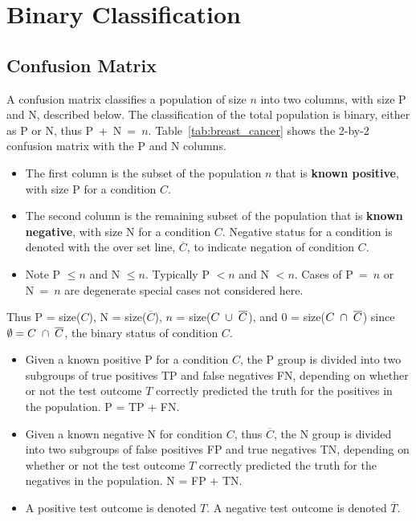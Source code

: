 \chapter{Binary Classification}

\section{Confusion Matrix}

A confusion matrix classifies a population of size $n$ into two 
columns, with size P and N, described below.  The classification
of the total population is binary, either as P 
or N, thus P~+~N~=~$n$.
Table~\ref{tab:breast_cancer} shows
the 2-by-2 confusion matrix with the P and N columns. 
\begin{itemize}
\item The first column is the subset of the population $n$
that is {\bf known positive}, with size P 
for a condition $C$.  
\item The second column is the remaining subset of 
the population that is {\bf known negative}, with
size N for a condition $C$.  Negative status for
a condition is denoted
with the over set line, $\overline{C}$, 
to indicate negation of
condition $C$.  
\item Note P $\leq n$ and N $\leq n$.  Typically P $< n$
and N $< n$.  Cases of P~=~$n$ or N~=~$n$ are degenerate 
special cases not considered here.  
\end{itemize}
Thus
P = size($C$),
N = size($\overline{C}$),
$n$ = size($C \;\cup\; \overline{C}$), and
$0$ = size($C \;\cap\; \overline{C}$) since
$\emptyset = C \;\cap\; \overline{C}$, the 
binary status of condition $C$.
\begin{itemize}
\item Given a known positive P for a condition $C$, the 
P group is divided into two subgroups of 
true positives TP and 
false negatives FN, depending on whether 
or not the
test outcome $T$ correctly predicted the truth 
for the positives in the population.  P = TP + FN.
\item Given a known negative N for condition $C$, thus
$\overline{C}$, the 
N group is divided into two subgroups of 
false positives FP and
true negatives TN, depending on whether or 
not the test outcome $T$ correctly predicted
the truth for the negatives in the population. N = FP + TN.
\item A positive test outcome is denoted $T$.  A
negative test outcome is denoted $\overline{T}$.
\end{itemize}


